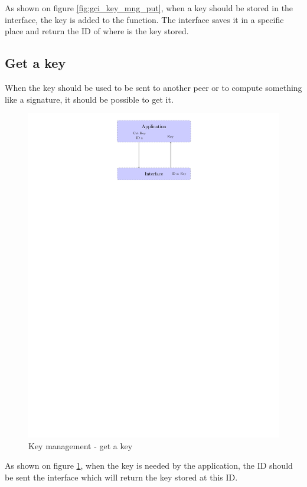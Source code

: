As shown on figure \ref{fig:gci_key_mng_put}, when a key should be stored in the
interface, the key is added to the function. The interface saves it in a
specific place and return the ID of where is the key stored.


\subsection*{Get a key}
When the key should be used to be sent to another peer or to compute
something like a signature, it should be possible to get it.

\begin{figure}[!ht]
\centering
\includegraphics[trim=12cm 22cm 11.5cm 0cm]{figures/key_manag_get_key.pdf}
\caption{Key management - get a key}
\label{fig:gci_key_mng_get}
\end{figure}

As shown on figure \ref{fig:gci_key_mng_get}, when the key is needed by the
application, the ID should be sent the interface which will return the key
stored at this ID.

